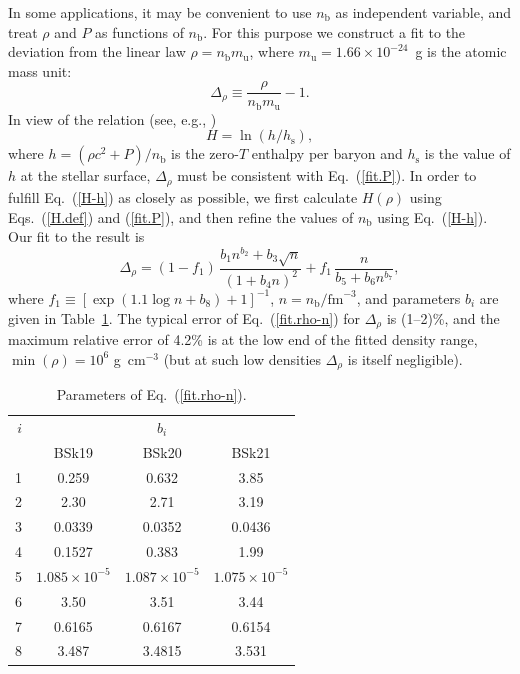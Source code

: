 \documentclass{aa}
\newcommand{\gcc}{\mbox{g cm$^{-3}$}}
\newcommand{\req}[1]{Eq.~(\ref{#1})}
\newcommand{\nb}{n_\mathrm{b}}
\begin{document}
In some applications, it may be convenient to use $\nb$ as
independent variable, and treat $\rho$ and $P$ as functions
of $\nb$. For this purpose we construct a fit to the
deviation from the linear law $\rho={\nb m_\mathrm{u}}$,
where $m_\mathrm{u} = 1.66\times10^{-24}$~g is the 
atomic mass unit:
\begin{equation}
   \Delta_\rho \equiv \frac{\rho}{\nb m_\mathrm{u}} -1.
\label{Delta}
\end{equation}
In view of the relation (see, e.g., \citealt{HP04})
\begin{equation}
H=\ln(h/h_\mathrm{s}),
\label{H-h}
\end{equation}
where $h=(\rho c^2 +P)/\nb$ is the zero-$T$ enthalpy per baryon
and $h_\mathrm{s}$ is the value of $h$ at the stellar surface,
$\Delta_\rho$ must be consistent with \req{fit.P}.
 In order to fulfill \req{H-h} as closely as possible,
 we first calculate $H(\rho)$
  using Eqs.~(\ref{H.def}) and (\ref{fit.P}),
and then refine the values of $\nb$ using \req{H-h}.
Our fit to the result is
\begin{equation}
   \Delta_\rho  = 
     (1-f_1)\,\frac{b_1 n^{b_2}+b_3 \sqrt{n}}{(1+b_4 n)^2}
     +  
   f_1\,  \frac{n}{b_5+ b_6 n^{b_7}},
\label{fit.rho-n}
\end{equation}
where $ f_1 \equiv 
\left[\exp(1.1\log n + b_8)+1\right]^{-1}$,
$n=\nb/\textrm{fm}^{-3}$, 
and parameters $b_i$ are given in
Table~\ref{tab:fit.rho-n}. The typical error of \req{fit.rho-n} for
$\Delta_\rho$ is (1--2)\%, and the maximum relative error
of 4.2\% is at the low end of the fitted density range,
$\min(\rho)=10^6$ \gcc{}
(but at such low densities $\Delta_\rho$ is itself
negligible).

\begin{table}
\centering
\caption[]{Parameters of \req{fit.rho-n}.}
\label{tab:fit.rho-n}
\begin{tabular}{r|ccc}
\hline\hline\rule[-1.4ex]{0pt}{4.3ex}
$i$ & \multicolumn{3}{c}{$b_i$}\\
  & BSk19 & BSk20 & BSk21  \\
\hline\rule{0pt}{2.7ex}
1  &   0.259 &            0.632 &             3.85 \\
2  &    2.30 &           2.71 &              3.19 \\
3  & 0.0339 &            0.0352 &            0.0436 \\
4  & 0.1527 &            0.383 &             1.99 \\
5  & $1.085\times10^{-5}$ & $1.087\times10^{-5}$ & $1.075\times10^{-5}$ \\
6  & 3.50 &              3.51 &              3.44 \\
7  & 0.6165 &            0.6167 &            0.6154 \\
8  & 3.487 &             3.4815 &             3.531 \\
\hline\hline
\end{tabular}
\end{table}
\end{document}
